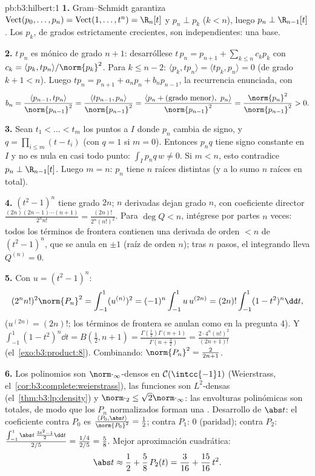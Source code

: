 \begin{solution}{pb:b3:hilbert:1}
\textbf{1.} Gram--Schmidt garantiza
$\operatorname{Vect}(p_0, \dots, p_n) =
\operatorname{Vect}(1, \dots, t^n) = \R_n[t]$ y $p_n \perp
p_k$ ($k < n$), luego $p_n \perp \R_{n-1}[t]$. Los $p_k$, de grados
estrictamente crecientes, son independientes: una base.

\textbf{2.} $t\,p_n$ es mónico de grado $n + 1$: desarróllese
$t\,p_n = p_{n+1} + \sum_{k\leq n}c_kp_k$ con $c_k =
\langle p_k, tp_n\rangle/\norm{p_k}^2$. Para $k \leq n - 2$:
$\langle p_k, tp_n\rangle = \langle tp_k, p_n\rangle = 0$
(de grado $k + 1 < n$). Luego $tp_n = p_{n+1} + a_np_n +
b_np_{n-1}$, la recurrencia enunciada, con
\[
b_n = \frac{\langle p_{n-1}, tp_n\rangle}{\norm{p_{n-1}}^2}
= \frac{\langle tp_{n-1}, p_n\rangle}{\norm{p_{n-1}}^2}
= \frac{\langle p_n + (\text{grado menor}),\
p_n\rangle}{\norm{p_{n-1}}^2}
= \frac{\norm{p_n}^2}{\norm{p_{n-1}}^2} > 0 .
\]

\textbf{3.} Sean $t_1 < \dots < t_m$ los puntos
 a $I$ donde $p_n$ cambia
de signo, y $q = \prod_{i\leq m}(t -
t_i)$ (con $q = 1$ si $m = 0$). Entonces $p_nq$ tiene signo constante en
$I$ y no es nula en casi todo punto: $\int_Ip_nq\,w \neq 0$. Si $m <
n$, esto contradice $p_n \perp \R_{n-1}[t]$. Luego $m = n$: $p_n$ tiene
$n$ raíces \omterm{def:b3:topology:interior}{interiores} distintas (y a
lo sumo $n$ raíces en total).

\textbf{4.} $(t^2 - 1)^n$ tiene grado $2n$; $n$ derivadas dejan grado
$n$, con coeficiente director $\frac{(2n)(2n-1)\cdots(n+1)}{2^nn!} =
\frac{(2n)!}{2^n(n!)^2}$. Para $\deg Q < n$, intégrese por partes $n$
veces: todos los términos de frontera contienen una derivada de orden
$< n$ de $(t^2-1)^n$, que se anula en $\pm1$ (raíz de orden $n$); tras
$n$ pasos, el integrando lleva $Q^{(n)} = 0$.

\textbf{5.} Con $u = (t^2 - 1)^n$:
\[
(2^nn!)^2\norm{P_n}^2 = \int_{-1}^1(u^{(n)})^2
= (-1)^n\int_{-1}^1 u\,u^{(2n)}
= (2n)!\int_{-1}^1(1 - t^2)^n\dd t ,
\]
($u^{(2n)} = (2n)!$; los términos de frontera se anulan como en la
pregunta 4). Y $\int_{-1}^1(1-t^2)^n\dd t = B(\tfrac12, n+1) =
\frac{\Gamma(\frac12)\Gamma(n+1)}{\Gamma(n + \frac32)} =
\frac{2\cdot4^n(n!)^2}{(2n+1)!}$ (el~\cref{exo:b3:product:8}).
Combinando: $\norm{P_n}^2 =
\frac{2}{2n + 1}$.

\textbf{6.} Los polinomios son $\norm\cdot_\infty$-densos en
$\mathcal C(\intcc{-1}1)$ (Weierstrass,
el~\cref{cor:b3:complete:weierstrass}), las funciones
 son $L^2$-densas
(el~\cref{thm:b3:lp:density}) y
$\norm\cdot_2 \leq \sqrt2\norm\cdot_\infty$: las envolturas polinómicas
son totales, de modo que los $P_n$ normalizados forman una
. Desarrollo de $\abs t$:
el coeficiente contra $P_0$ es
$\frac{\langle P_0, \abs t\rangle}{\norm{P_0}^2} = \frac12$;
contra $P_1$: $0$ (paridad); contra $P_2$:
$\frac{\int_{-1}^1\abs t\,\frac{3t^2-1}2\dd t}{2/5} =
\frac{1/4}{2/5} = \frac58$. Mejor aproximación cuadrática:
\[
\abs t \approx \frac12 + \frac58\,P_2(t) = \frac{3}{16} +
\frac{15}{16}\,t^2 .
\]


\end{solution}
